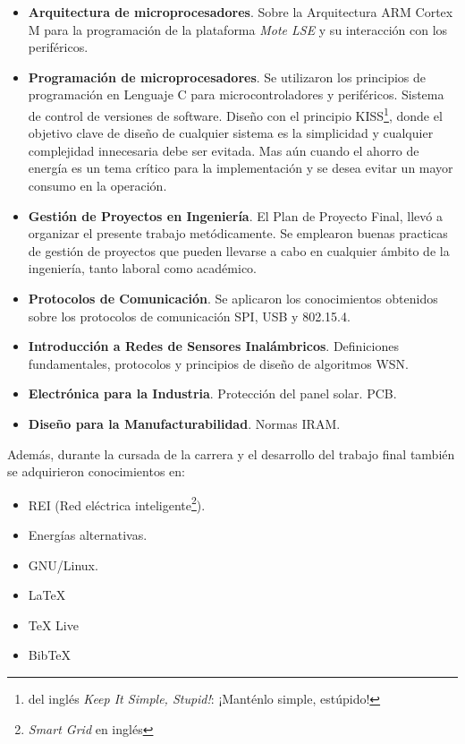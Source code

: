 \begin{itemize}
\item
\textbf{Arquitectura de microprocesadores}. Sobre la Arquitectura ARM Cortex M para la programación de la plataforma \textit{Mote LSE} y su interacción con los periféricos.

\item
\textbf{Programación de microprocesadores}. Se utilizaron los principios de programación en Lenguaje C para microcontroladores y periféricos. Sistema de control de versiones de software. Diseño con el principio KISS\footnote{del inglés \textit{Keep It Simple, Stupid!}: ¡Manténlo simple, estúpido!}, donde el objetivo clave de diseño de cualquier sistema es la simplicidad y cualquier complejidad innecesaria debe ser evitada. Mas aún cuando el ahorro de energía es un tema crítico para la implementación y se desea evitar un mayor consumo en la operación. 

\item
\textbf{Gestión de Proyectos en Ingeniería}. El Plan de Proyecto Final, llevó a organizar el presente trabajo metódicamente. Se emplearon buenas practicas de gestión de proyectos que pueden llevarse a cabo en cualquier ámbito de la ingeniería, tanto laboral como académico.

\item 
\textbf{Protocolos de Comunicación}. Se aplicaron los conocimientos obtenidos sobre los protocolos de comunicación SPI, USB y 802.15.4.

\item 
\textbf{Introducción a Redes de Sensores Inalámbricos}. Definiciones fundamentales, protocolos y principios de diseño de algoritmos WSN.

\item 
\textbf{Electrónica para la Industria}. Protección del panel solar. PCB.

\item 
\textbf{Diseño para la Manufacturabilidad}. Normas IRAM.
\end{itemize}
\medskip

\noindent Además, durante la cursada de la carrera y el desarrollo del trabajo final también se adquirieron conocimientos en:

\begin{itemize}
	\item REI (Red eléctrica inteligente\footnote{\textit{Smart Grid} en inglés}).
	\item Energías alternativas.	
	\item GNU/Linux.
	\item \LaTeX \citep{LaTeX}
	\item TeX Live \citep{TeX Live}
	\item BibTeX \citep{BibTeX}
	
\end{itemize}

